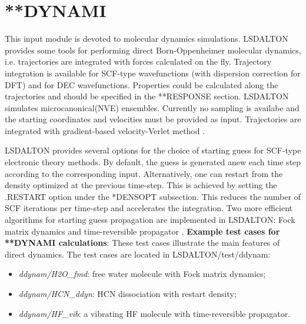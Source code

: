 \section{**DYNAMI}\label{sec:dynami}
This input module is devoted to molecular dynamics simulations. LSDALTON provides some tools for performing
direct Born-Oppenheimer molecular dynamics, i.e. trajectories are integrated with forces calculated on the fly.
Trajectory integration is available for SCF-type wavefunctions (with dispersion correction for DFT)
  and for DEC wavefunctions. Properties could be calculated along the trajectories and should be
 specified in the **RESPONSE section.
LSDALTON simulates microcanonical(NVE) ensembles. Currently no sampling is availabe and the starting coordinates
and velocities must be provided as input. Trajectories are integrated with gradient-based velocity-Verlet 
method \cite{Verlet}. 

LSDALTON provides several options for the choice of starting guess for SCF-type electronic theory methods. By
default, the guess is generated anew each time step according to the corresponding input. Alternatively, one can
restart from the density optimized at the previous time-step. This is achieved by setting the .RESTART option under
the *DENSOPT subsection. This reduces the number of SCF iterations per time-step and accelerates the integration. 
Two more efficient algorithms for starting guess propagation are implemented in LSDALTON: Fock matrix dynamics \cite{FMD} 
 and time-reversible propagator \cite{TimRev}.  
\newline
\vspace{1 cm}
\noindent
\textbf{Example test cases for **DYNAMI calculations}: \newline
These test cases illustrate the main features of direct dynamics. The test cases are located in LSDALTON/test/ddynam:
\begin{itemize}
\item
\textit{ddynam/H2O\_fmd}: free water molecule with Fock matrix dynamics; 
\item
\textit{ddynam/HCN\_ddyn}: HCN dissociation with restart density; 
\item
\textit{ddynam/HF\_vib}: a vibrating HF molecule with time-reversible propagator.
\end{itemize}


